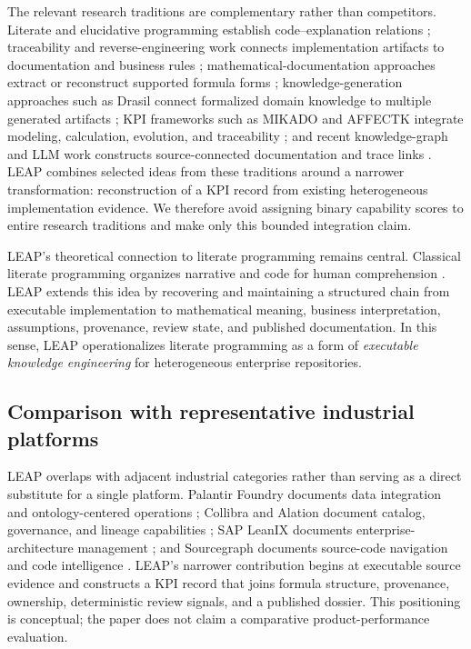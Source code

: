 \documentclass[a4paper,fleqn]{cas-dc}
\newcommand{\tool}{\textsc{LEAP}}
\begin{document}
The relevant research traditions are complementary rather than competitors. Literate and elucidative programming establish code--explanation relations \citep{Knuth1984,Normark2000}; traceability and reverse-engineering work connects implementation artifacts to documentation and business rules \citep{Marcus2005,PutryczKark2008,MaderGotel2012}; mathematical-documentation approaches extract or reconstruct supported formula forms \citep{Moser2015,Moseler2021}; knowledge-generation approaches such as Drasil connect formalized domain knowledge to multiple generated artifacts \citep{Carette2023}; KPI frameworks such as MIKADO and AFFECTK integrate modeling, calculation, evolution, and traceability \citep{DeSanctis2022,Dominguez2025}; and recent knowledge-graph and LLM work constructs source-connected documentation and trace links \citep{Wang2023,Alor2026,Kelious2026}. \tool{} combines selected ideas from these traditions around a narrower transformation: reconstruction of a KPI record from existing heterogeneous implementation evidence. We therefore avoid assigning binary capability scores to entire research traditions and make only this bounded integration claim.

LEAP's theoretical connection to literate programming remains central. Classical literate programming organizes narrative and code for human comprehension \citep{Knuth1984}. LEAP extends this idea by recovering and maintaining a structured chain from executable implementation to mathematical meaning, business interpretation, assumptions, provenance, review state, and published documentation. In this sense, LEAP operationalizes literate programming as a form of \emph{executable knowledge engineering} for heterogeneous enterprise repositories.

\subsection{Comparison with representative industrial platforms}
\label{sec:platform-comparison}

LEAP overlaps with adjacent industrial categories rather than serving as a direct substitute for a single platform. Palantir Foundry documents data integration and ontology-centered operations \citep{PalantirDocs}; Collibra and Alation document catalog, governance, and lineage capabilities \citep{CollibraDocs,AlationDocs}; SAP LeanIX documents enterprise-architecture management \citep{LeanIXDocs}; and Sourcegraph documents source-code navigation and code intelligence \citep{SourcegraphDocs}. LEAP's narrower contribution begins at executable source evidence and constructs a KPI record that joins formula structure, provenance, ownership, deterministic review signals, and a published dossier. This positioning is conceptual; the paper does not claim a comparative product-performance evaluation.
\end{document}
